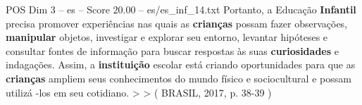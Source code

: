 \begin{textsample}{POS Dim 3 – es – Score 20.00 – es/es\_inf\_14.txt}
Portanto, a Educação \textbf{Infantil} precisa promover experiências nas quais as \textbf{crianças} possam fazer observações, \textbf{manipular} objetos, investigar e explorar seu entorno, levantar hipóteses e consultar fontes de informação para buscar respostas às suas \textbf{curiosidades} e indagações.
Assim, a \textbf{instituição} escolar está criando oportunidades para que as \textbf{crianças} ampliem seus conhecimentos do mundo físico e sociocultural e possam utilizá -los em seu cotidiano. > > ( BRASIL, 2017, p. 38-39 )

\end{textsample}
